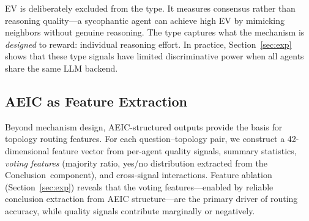 EV is deliberately excluded from the type. It measures consensus rather than reasoning quality---a sycophantic agent can achieve high EV by mimicking neighbors without genuine reasoning. The type captures what the mechanism is \emph{designed} to reward: individual reasoning effort. In practice, Section~\ref{sec:exp} shows that these type signals have limited discriminative power when all agents share the same LLM backend.

\subsection{AEIC as Feature Extraction}
\label{sec:aeic_features}

Beyond mechanism design, AEIC-structured outputs provide the basis for topology routing features. For each question--topology pair, we construct a 42-dimensional feature vector from per-agent quality signals, summary statistics, \emph{voting features} (majority ratio, yes/no distribution extracted from the Conclusion~component), and cross-signal interactions. Feature ablation (Section~\ref{sec:exp}) reveals that the voting features---enabled by reliable conclusion extraction from AEIC structure---are the primary driver of routing accuracy, while quality signals contribute marginally or negatively.
